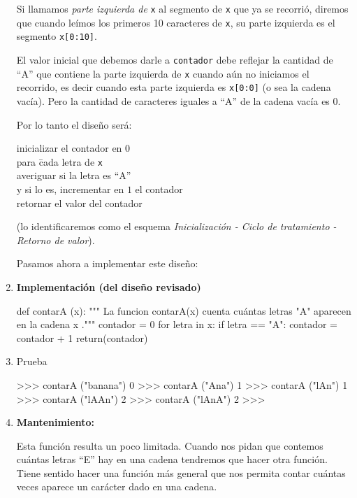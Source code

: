 \begin{enumerate}
Si llamamos {\it parte izquierda de } \lstinline+x+ al segmento de
\lstinline+x+ que ya se recorrió, diremos que cuando leímos los primeros 10
caracteres de \lstinline+x+, su parte izquierda es el segmento
\lstinline+x[0:10]+.

El valor inicial que debemos darle a \lstinline+contador+ debe reflejar la
cantidad de ``A'' que contiene la parte izquierda de \lstinline+x+ cuando
aún no iniciamos el recorrido, es decir cuando esta parte izquierda es
\lstinline+x[0:0]+ (o sea la cadena vacía). Pero la cantidad de caracteres
iguales a ``A'' de la cadena vacía es $0$.

Por lo tanto el diseño será:

\begin{tabbing}
inicializar el contador en $0$\\
para \= cada letra de \lstinline+x+\\
\> averiguar si la letra es ``A'' \\
\> y si lo es, incrementar en $1$ el contador\\
retornar el valor del contador\\
\end{tabbing}

(lo identificaremos como el esquema {\it Inicialización - Ciclo de tratamiento - Retorno de valor}).

Pasamos ahora a implementar este diseño:

\item {\bf Implementación (del diseño revisado)}

\begin{codigo-python}
def contarA (x):
    """ La funcion contarA(x) cuenta cuántas
        letras "A" aparecen en la cadena x ."""
    contador = 0
    for letra in x:
        if letra == "A":
            contador = contador + 1
    return(contador)
\end{codigo-python}

\item Prueba
\begin{codigo-python-sn}
>>> contarA ("banana")
0
>>> contarA ("Ana")
1
>>> contarA ("lAn")
1
>>> contarA ("lAAn")
2
>>> contarA ("lAnA")
2
>>>
\end{codigo-python-sn}

\item {\bf Mantenimiento:}

Esta función resulta un poco limitada. Cuando nos pidan que contemos
cuántas letras ``E'' hay en una cadena tendremos que hacer otra función.
Tiene sentido hacer una función más general que nos permita contar cuántas
veces aparece un carácter dado en una cadena.


\end{enumerate}
